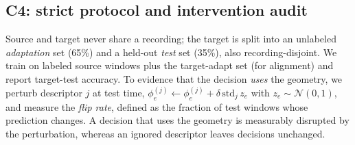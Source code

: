 \subsection{C4: strict protocol and intervention audit}
\label{sec:c4}

Source and target never share a recording; the target is split into an unlabeled
\emph{adaptation} set (65\%) and a held-out \emph{test} set (35\%), also
recording-disjoint. We train on labeled source windows plus the target-adapt set
(for alignment) and report target-test accuracy. To evidence that the decision
\emph{uses} the geometry, we perturb descriptor $j$ at test time,
$\phi^{(j)}_e \leftarrow \phi^{(j)}_e + \delta\,\mathrm{std}_j\,z_e$ with
$z_e\sim\mathcal{N}(0,1)$, and measure the \emph{flip rate}, defined as the
fraction of test windows whose prediction changes. A decision that uses the geometry is
measurably disrupted by the perturbation, whereas an ignored descriptor leaves
decisions unchanged.
